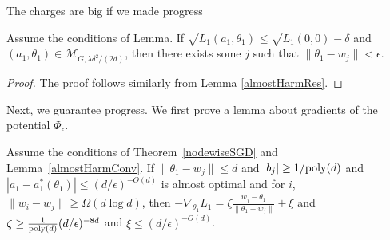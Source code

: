 The charges are big if we made progress
%
\begin{lemma}\label{nodeRes}
  Assume the conditions of Lemma. If
$\sqrt{L_1(a_1,\theta_1)} \leq \sqrt{L_1(0, 0)} - \delta$
  and $(a_1,\theta_1) \in \mathcal{M}_{G,\lambda \delta^2/(2d)}$,
  then there exists some $j$ such that $\|\theta_1 - w_j\| <\epsilon$.
\end{lemma}
%
\begin{proof}
The proof follows similarly from Lemma \ref{almostHarmRes}.
\end{proof}
 Next, we guarantee progress. We first prove a lemma about gradients of the potential $\Phi_\epsilon$.

\begin{lemma}\label{nodeGradient}
Assume the conditions of Theorem~\ref{nodewiseSGD} and Lemma~\ref{almostHarmConv}. If $\|\theta_1 - w_j\| \leq d$ and $|b_j|\geq 1/\mathrm{poly}(d)$ and $|a_1 - a_1^*(\theta_1)| \leq (d/\epsilon)^{-O(d)}$ is almost optimal and for $i$, $\|w_i - w_j\| \geq \Omega(d \log d)$, then $-\nabla_{\theta_1}L_1 = \zeta \frac{w_j - \theta_1}{\|\theta_1 - w_j\|} + \xi$ and $\zeta \geq  \frac{1}{\mathrm{poly}(d)}(d/\epsilon)^{-8d}$ and $\xi \leq (d/\epsilon)^{-O(d)}$. 
\end{lemma}

